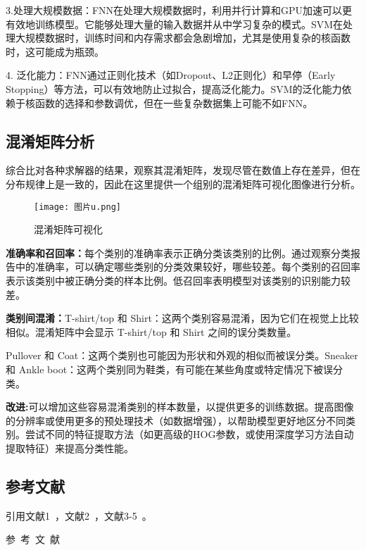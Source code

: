 \documentclass[10.5pt,compsoc,UTF8]{CjC}
\theoremstyle{mystyle}
\begin{document}
3.处理大规模数据：FNN在处理大规模数据时，利用并行计算和GPU加速可以更有效地训练模型。它能够处理大量的输入数据并从中学习复杂的模式。SVM在处理大规模数据时，训练时间和内存需求都会急剧增加，尤其是使用复杂的核函数时，这可能成为瓶颈。

4. 泛化能力：FNN通过正则化技术（如Dropout、L2正则化）和早停（Early Stopping）等方法，可以有效地防止过拟合，提高泛化能力。SVM的泛化能力依赖于核函数的选择和参数调优，但在一些复杂数据集上可能不如FNN。
\subsection{混淆矩阵分析}
综合比对各种求解器的结果，观察其混淆矩阵，发现尽管在数值上存在差异，但在分布规律上是一致的，因此在这里提供一个组别的混淆矩阵可视化图像进行分析。
\begin{figure}[h] %
    \centering %
    \texttt{[image: 图片u.png]} %
    \caption{混淆矩阵可视化} %
\end{figure}

\textbf{准确率和召回率：}每个类别的准确率表示正确分类该类别的比例。通过观察分类报告中的准确率，可以确定哪些类别的分类效果较好，哪些较差。每个类别的召回率表示该类别中被正确分类的样本比例。低召回率表明模型对该类别的识别能力较差。

\textbf{类别间混淆：}T-shirt/top 和 Shirt：这两个类别容易混淆，因为它们在视觉上比较相似。混淆矩阵中会显示 T-shirt/top 和 Shirt 之间的误分类数量。

Pullover 和 Coat：这两个类别也可能因为形状和外观的相似而被误分类。Sneaker 和 Ankle boot：这两个类别同为鞋类，有可能在某些角度或特定情况下被误分类。

\textbf{改进:}可以增加这些容易混淆类别的样本数量，以提供更多的训练数据。提高图像的分辨率或使用更多的预处理技术（如数据增强），以帮助模型更好地区分不同类别。尝试不同的特征提取方法（如更高级的HOG参数，或使用深度学习方法自动提取特征）来提高分类性能。


\subsection{参考文献}
引用文献1~\cite{DU2024151828}，文献2~\cite{WAN2024104773}，文献3-5~\cite{HAN2023107839,YUAN2021759,ZHANG2024}。





\vspace {10mm}
\centerline
{\textsf{参~考~文~献}}
 \addtolength{\itemsep}{-1em}
\vspace {1.5mm}


\end{document}
